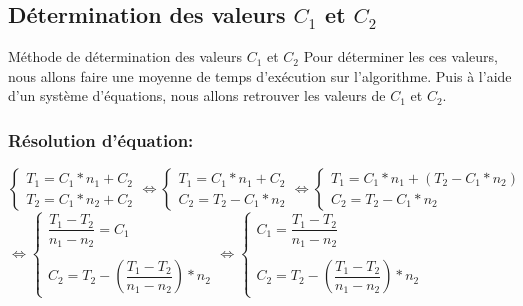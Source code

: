 \documentclass[12pt,a4paper]{report}
\begin{document}
\subsection{Détermination des valeurs $C_{1}$ et $C_{2}$}
\begin{flushleft}
\begin{mybox}{Méthode de détermination des valeurs $C_{1}$ et $C_{2}$}
Pour déterminer les ces valeurs, nous allons faire une moyenne de temps d'exécution sur l'algorithme. Puis à l'aide d'un système d'équations, nous allons retrouver les valeurs de $C_{1}$ et $C_{2}$. 
\end{mybox}
\subsubsection{Résolution d'équation:}
$\left\lbrace\begin{array}{c}
T_{1} = C_{1}*n_{1}+C_{2}\\
T_{2}= C_{1}*n_{2}+C_{2}
\end{array} \right. \Leftrightarrow 
\left\lbrace\begin{array}{c}
T_{1} = C_{1}*n_{1}+C_{2}\\
C_{2}=T_{2}-C_{1}*n_{2}
\end{array} \right.\Leftrightarrow
\left\lbrace\begin{array}{c}
T_{1} = C_{1}*n_{1}+(T_{2}-C_{1}*n_{2})\\
C_{2}=T_{2}-C_{1}*n_{2}
\end{array} \right.$ \\ $ 
\Leftrightarrow 
\left\lbrace\begin{array}{c}
\dfrac{T_{1}-T_{2}}{n_{1}-n_{2}} = C_{1}\\ \\
C_{2}=T_{2}-\left(\dfrac{T_{1}-T_{2}}{n_{1}-n_{2}}\right)*n_{2}
\end{array} \right.
\Leftrightarrow
\left\lbrace\begin{array}{c}
C_{1} = \dfrac{T_{1}-T_{2}}{n_{1}-n_{2}}\\ \\
C_{2}=T_{2}-\left(\dfrac{T_{1}-T_{2}}{n_{1}-n_{2}}\right)*n_{2}
\end{array} \right. $

\end{flushleft}
\end{document}
